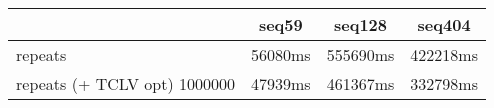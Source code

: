 \begin{tabular}{|l|c|c|c|}
\hline
 & seq59 & seq128 & seq404  \\
\hline
repeats &  56080ms &  555690ms &  422218ms\\
\hline
repeats (+ TCLV opt) 1000000 &  47939ms &  461367ms &  332798ms\\
\hline
\end{tabular}
